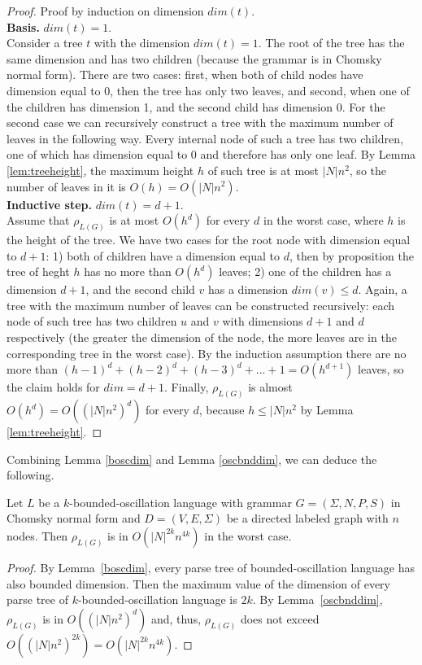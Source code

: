 \begin{proof}
Proof by induction on dimension $dim(t)$.
\\
\textbf{Basis.} $dim(t) = 1$.
\\
Consider a tree $t$ with the dimension $dim(t) = 1$. The root of the tree has the same dimension and has two children (because the grammar is in Chomsky normal form). There are two cases:  first, when both of child nodes have dimension equal to 0, then the tree has only two leaves, and second, when one of the children has dimension 1, and the second child has dimension 0. For the second case we can recursively construct a tree with the maximum number of leaves in the following way. Every internal node of such a tree has two children, one of which has dimension equal to 0 and therefore has only one leaf. By Lemma \ref{lem:treeheight}, the maximum height $h$ of such tree is at most $|N|n^2$, so the number of leaves in it is $O(h) = O(|N|n^2)$.
\\
\textbf{Inductive step.} $dim(t) = d + 1$.
\\
Assume that $\rho_{L(G)}$ is at most $O(h^{d})$ for every $d$ in the worst case, where $h$ is the height of the tree. We have two cases for the root node with dimension equal to $d+1$: 1) both of children have a dimension equal to $d$, then by proposition the tree of heght $h$ has no more than $O(h^{d})$ leaves; 2) one of the children has a dimension $d + 1$, and the second child $v$ has a dimension $dim(v) \le d$. Again, a tree with the maximum number of leaves can be constructed recursively:  each node of such tree has two children $u$ and $v$ with dimensions $d+1$ and $d$ respectively (the greater the dimension of the node, the more leaves are in the corresponding tree in the worst case). By the induction assumption there are no more than $(h-1)^d + (h-2)^d + (h-3)^d + ... + 1 = O(h^{d+1})$ leaves, so the claim holds for $dim = d+1$. Finally, $\rho_{L(G)}$ is almost $O(h^{d}) = O({(|N|n^2)}^d)$ for every $d$, because $h \le |N|n^2$ by Lemma \ref{lem:treeheight}. 
\end{proof}
Combining Lemma \ref{boscdim} and Lemma \ref{oscbnddim}, we can deduce the following.
\begin{theorem}
\label{oscbndosc}
Let $L$ be a $k$-bounded-oscillation language with grammar $G = (\Sigma, N, P, S)$ in Chomsky normal form and $D=(V, E, \Sigma)$ be a directed labeled graph with $n$ nodes. Then $\rho_{L(G)}$ is in $O({|N|}^{2k}n^{4k})$ in the worst case.
\end{theorem}
\begin{proof}
By Lemma~\ref{boscdim}, every parse tree of bounded-oscillation language has also bounded dimension. Then the maximum value of the dimension of every parse tree of $k$-bounded-oscillation language is $2k$. By Lemma~\ref{oscbnddim}, $\rho_{L(G)}$ is in $O({(|N|n^2)}^d)$ and, thus, $\rho_{L(G)}$ does not exceed $O({(|N|n^2)}^{2k}) = O({|N|}^{2k}n^{4k})$.
\end{proof}

